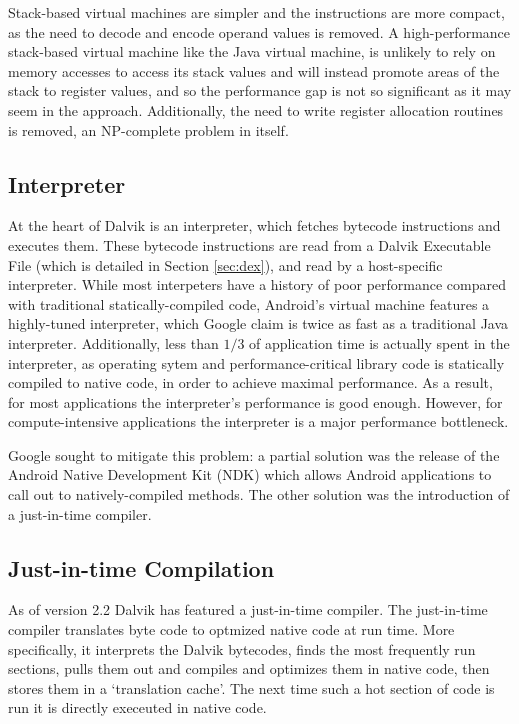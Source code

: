 Stack-based virtual machines are simpler and the instructions are more compact, as the need to decode and encode operand values is removed. A high-performance stack-based virtual machine like the Java virtual machine, is unlikely to rely on memory accesses to access its stack values and will instead promote areas of the stack to register values, and so the performance gap is not so significant as it may seem in the \naive approach. Additionally, the need to write register allocation routines is removed, an NP-complete problem in itself\cite{chaitin82}.

\subsection*{Interpreter}

At the heart of Dalvik is an interpreter, which fetches bytecode instructions and executes them. These bytecode instructions are read from a Dalvik Executable File (which is detailed in Section \ref{sec:dex}), and read by a host-specific interpreter. While most interpeters have a history of poor performance compared with traditional statically-compiled code, Android's virtual machine features a highly-tuned interpreter, which Google claim is twice as fast as a traditional Java interpreter\cite{android_22}. Additionally, less than $1/3$ of application time is actually spent in the interpreter, as operating sytem and performance-critical library code is statically compiled to native code, in order to achieve maximal performance. As a result, for most applications the interpreter's performance is good enough. However, for compute-intensive applications the interpreter is a major performance bottleneck.

Google sought to mitigate this problem: a partial solution was the release of the Android Native Development Kit (NDK) which allows Android applications to call out to natively-compiled methods\cite{android_22}. The other solution was the introduction of a just-in-time compiler.

\subsection*{Just-in-time Compilation}

As of version 2.2 Dalvik has featured a just-in-time compiler\cite{android_22}. The just-in-time compiler translates byte code to optmized native code at run time. More specifically, it interprets the Dalvik bytecodes, finds the most frequently run sections, pulls them out and compiles and optimizes them in native code, then stores them in a `translation cache'. The next time such a hot section of code is run it is directly execeuted in native code.

